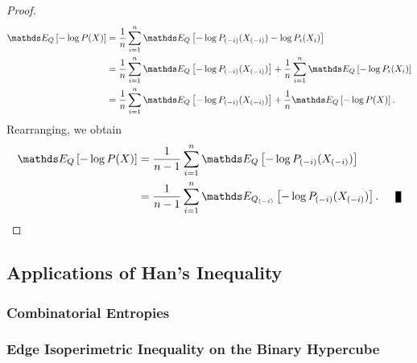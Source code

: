 \documentclass[11pt]{article}
\begin{document}
\begin{itemize}
\begin{proof}
\begin{align*}
\E{Q}{-\log P(X)} &= \frac{1}{n}\sum_{i=1}^{n}\E{Q}{-\log P_{(-i)}(X_{(-i)}) -\log P_i(X_i)} \\
&= \frac{1}{n}\sum_{i=1}^{n}\E{Q}{-\log P_{(-i)}(X_{(-i)})} + \frac{1}{n}\sum_{i=1}^{n}\E{Q}{-\log P_i(X_i)}\\
&= \frac{1}{n}\sum_{i=1}^{n}\E{Q}{-\log P_{(-i)}(X_{(-i)})} + \frac{1}{n}\E{Q}{-\log P(X)}.
\end{align*} Rearranging, we obtain
\begin{align*}
\E{Q}{-\log P(X)} &= \frac{1}{n-1}\sum_{i=1}^{n}\E{Q}{-\log P_{(-i)}(X_{(-i)})}\\
&=\frac{1}{n-1}\sum_{i=1}^{n}\E{Q_{(-i)}}{-\log P_{(-i)}(X_{(-i)})}. \qed
\end{align*}
\end{proof}
\end{itemize}

\subsection{Applications of Han's Inequality}
\subsubsection{Combinatorial Entropies}
\subsubsection{Edge Isoperimetric Inequality on the Binary Hypercube}
\end{document}
